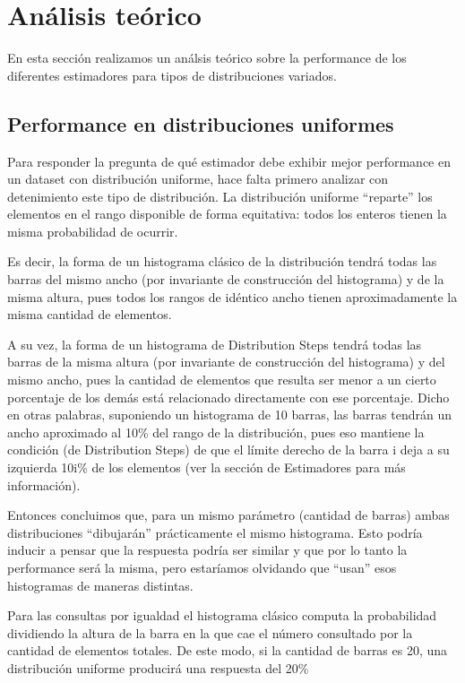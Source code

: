 \section{Análisis teórico}
En esta sección realizamos un análsis teórico sobre la performance de los diferentes estimadores para tipos de distribuciones variados.

\subsection{Performance en distribuciones uniformes}
Para responder la pregunta de qué estimador debe exhibir mejor performance en un dataset con distribución uniforme, hace falta primero analizar con detenimiento este tipo de distribución. La distribución uniforme ``reparte'' los elementos en el rango disponible de forma equitativa: todos los enteros tienen la misma probabilidad de ocurrir.

Es decir, la forma de un histograma clásico de la distribución tendrá todas las barras del mismo ancho (por invariante de construcción del histograma) y de la misma altura, pues todos los rangos de idéntico ancho tienen aproximadamente la misma cantidad de elementos.

A su vez, la forma de un histograma de Distribution Steps tendrá todas las barras de la misma altura (por invariante de construcción del histograma) y del mismo ancho, pues la cantidad de elementos que resulta ser menor a un cierto porcentaje de los demás está relacionado directamente con ese porcentaje. Dicho en otras palabras, suponiendo un histograma de 10 barras, las barras tendrán un ancho aproximado al 10\% del rango de la distribución, pues eso mantiene la condición (de Distribution Steps) de que el límite derecho de la barra i deja a su izquierda 10i\% de los elementos (ver la sección de Estimadores para más información).

Entonces concluimos que, para un mismo parámetro (cantidad de barras) ambas distribuciones ``dibujarán'' prácticamente el mismo histograma. Esto podría inducir a pensar que la respuesta podría ser similar y que por lo tanto la performance será la misma, pero estaríamos olvidando que ``usan'' esos histogramas de maneras distintas.

Para las consultas por igualdad el histograma clásico computa la probabilidad dividiendo la altura de la barra en la que cae el número consultado por la cantidad de elementos totales. De este modo, si la cantidad de barras es 20, una distribución uniforme producirá una respuesta del 20\%



